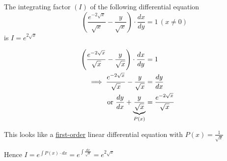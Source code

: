\documentclass[14pt,fleqn]{extarticle}
\newcommand\trma{\frac{e^{-2\sqrt{x}}}{\sqrt{x}}}
\newcommand\trmb{\frac{y}{\sqrt{x}}}
\begin{document}
 
\begin{snippet}
    \correct
    
    The integrating factor $(I)$ of the following differential equation 
    \[ \qquad \left(\trma -\trmb \right)\cdot \frac{dx}{dy} = 1\, (x\neq 0)\]
    is $I = e^{2\sqrt{x}}$ 
    
    \reason
    
    \begin{align}
	\left(\trma - \trmb \right)\cdot \frac{dx}{dy} &= 1 \\
	\implies \trma - \trmb &= \dydx \\
	\text{or } \dydx + \underbrace{\trmb}_{P(x)} &= \trma 
\end{align}
    
This looks like a \underline{first-order} linear differential equation with $P(x) = \frac{1}{\sqrt{x}}$ \newline 

Hence $I = e^{\int P(x)\cdot dx} = e^{\int \frac{dx}{\sqrt{x}}} = e^{2\sqrt{x}}$ 

\end{snippet} 
\end{document}
